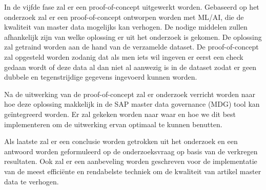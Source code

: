 In de vijfde fase zal er een proof-of-concept uitgewerkt worden. Gebaseerd op het onderzoek zal er een proof-of-concept ontworpen worden met ML/AI, die de kwaliteit van master data mogelijks kan verhogen. De nodige middelen zullen afhankelijk zijn van welke oplossing er uit het onderzoek is gekomen. De oplossing zal getraind worden aan de hand van de verzamelde dataset. De proof-of-concept zal opgesteld worden zodanig dat als men iets wil ingeven er eerst een check gedaan wordt of deze data al dan niet al aanwezig is in de dataset zodat er geen dubbele en tegenstrijdige gegevens ingevoerd kunnen worden.

Na de uitwerking van de proof-of-concept zal er onderzoek verricht worden naar hoe deze oplossing makkelijk in de SAP master data governance (MDG) tool kan geïntegreerd worden. Er zal gekeken worden naar waar en hoe we dit best implementeren om de uitwerking ervan optimaal te kunnen benutten.

Als laatste zal er een conclusie worden getrokken uit het onderzoek en een antwoord worden geformuleerd op de onderzoeksvraag op basis van de verkregen resultaten. Ook zal er een aanbeveling worden geschreven voor de implementatie van de meest efficiënte en rendabelste techniek om de kwaliteit van artikel master data te verhogen. 

